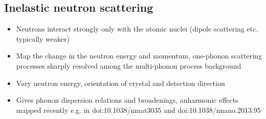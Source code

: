 \subsection{Inelastic neutron scattering}
 \begin{itemize}
  \item Neutrons interact strongly only with the atomic nuclei (dipole scattering etc. typically weaker)
  \item Map the change in the neutron energy and momentum, one-phonon scattering processes sharply resolved among the multi-phonon process background
  \item Vary neutron energy, orientation of crystal and detection direction
  \item Gives phonon dispersion relations and broadenings, anharmonic effects mapped recently e.g. in doi:10.1038/nmat3035 and doi:10.1038/nnano.2013.95
 \end{itemize}
\fi
